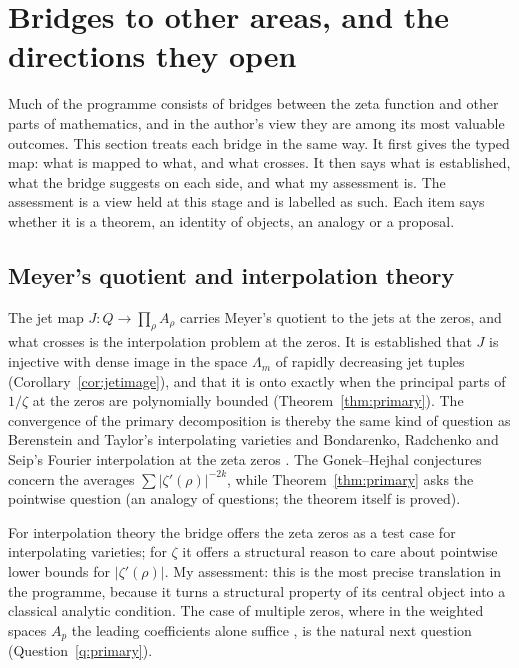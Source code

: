 \section{Bridges to other areas, and the directions they open}\label{sec:bridges}

Much of the programme consists of bridges between the zeta function and other parts of mathematics, and in the author's view they are among its most valuable outcomes. This section treats each bridge in the same way. It first gives the typed map: what is mapped to what, and what crosses. It then says what is established, what the bridge suggests on each side, and what my assessment is. The assessment is a view held at this stage and is labelled as such. Each item says whether it is a theorem, an identity of objects, an analogy or a proposal.

\subsection{Meyer's quotient and interpolation theory}

The jet map $J:Q\to\prod_\rho A_\rho$ carries Meyer's quotient to the jets at the zeros, and what crosses is the interpolation problem at the zeros. It is established that $J$ is injective with dense image in the space $\Lambda_m$ of rapidly decreasing jet tuples (Corollary~\ref{cor:jetimage}), and that it is onto exactly when the principal parts of $1/\zeta$ at the zeros are polynomially bounded (Theorem~\ref{thm:primary}).
The convergence of the primary decomposition is thereby the same kind of question as Berenstein and Taylor's interpolating varieties \cite{BerensteinTaylor} and Bondarenko, Radchenko and Seip's Fourier interpolation at the zeta zeros \cite{BondarenkoRadchenkoSeip}. The Gonek--Hejhal conjectures concern the averages $\sum|\zeta'(\rho)|^{-2k}$, while Theorem~\ref{thm:primary} asks the pointwise question (an analogy of questions; the theorem itself is proved).

For interpolation theory the bridge offers the zeta zeros as a test case for interpolating varieties; for $\zeta$ it offers a structural reason to care about pointwise lower bounds for $|\zeta'(\rho)|$.
My assessment: this is the most precise translation in the programme, because it turns a structural property of its central object into a classical analytic condition. The case of multiple zeros, where in the weighted spaces $A_p$ the leading coefficients alone suffice \cite[Theorem~4]{BerensteinTaylor}, is the natural next question (Question~\ref{q:primary}).

